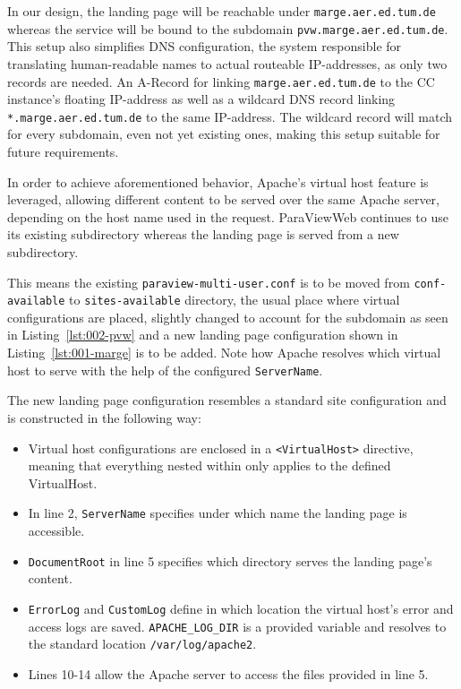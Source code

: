 In our design, the landing page will be reachable under
\texttt{marge.aer.ed.tum.de} whereas the service will be bound to the subdomain
\texttt{pvw.marge.aer.ed.tum.de}. This setup also simplifies DNS configuration,
the system responsible for translating human-readable names to actual routeable
IP-addresses, as only two records are needed. An A-Record for linking
\texttt{marge.aer.ed.tum.de} to the CC instance's floating IP-address as well as
a wildcard DNS record linking \texttt{*.marge.aer.ed.tum.de} to the same
IP-address. The wildcard record will match for every subdomain, even not yet
existing ones, making this setup suitable for future requirements. 

In order to achieve aforementioned behavior, Apache's virtual host feature is
leveraged, allowing different content to be served over the same Apache server,
depending on the host name used in the request. ParaViewWeb continues to use its
existing subdirectory whereas the landing page is served from a new
subdirectory.

This means the existing \texttt{paraview-multi-user.conf} is to be moved from
\texttt{conf-available} to \texttt{sites-available} directory, the usual place
where virtual configurations are placed, slightly changed to account for the
subdomain as seen in Listing~\ref{lst:002-pvw} and a new landing page
configuration shown in Listing~\ref{lst:001-marge} is to be added. Note how
Apache resolves which virtual host to serve with the help of the configured
\texttt{ServerName}.

The new landing page configuration resembles a standard site configuration and
is constructed in the following way:
\begin{itemize}
    \item Virtual host configurations are enclosed in a \texttt{<VirtualHost>}
    directive, meaning that everything nested within only applies to the defined
    VirtualHost.
    \item In line 2, \texttt{ServerName} specifies under which name the
    landing page is accessible.
    \item \texttt {DocumentRoot} in line 5 specifies which directory serves
    the landing page's content.
    \item \texttt{ErrorLog} and \texttt{CustomLog} define in which
    location the virtual host's error and access logs are saved.
    \texttt{APACHE\_LOG\_DIR} is a provided variable and resolves to the
    standard location \texttt{/var/log/apache2}.
    \item Lines 10-14 allow the Apache server to access the files provided in
    line 5.
\end{itemize}


